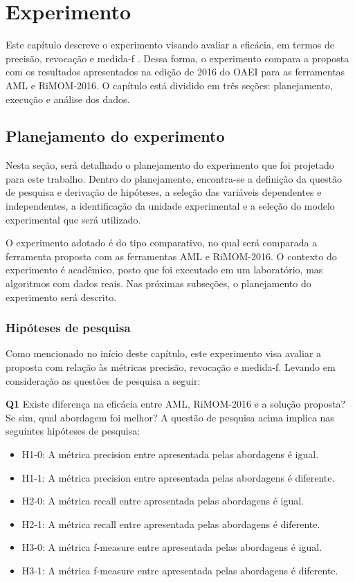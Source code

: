 \chapter{Experimento}
Este capítulo descreve o experimento visando avaliar a eficácia, em termos de precisão, revocação e medida-f \cite{goutte2005probabilistic}. Dessa forma,  o experimento compara a proposta com os resultados apresentados na edição de 2016 do OAEI para as ferramentas AML e RiMOM-2016.
O capítulo está dividido em três seções: planejamento, execução e análise dos dados. 

\section{Planejamento do experimento}

Nesta seção, será detalhado o planejamento do experimento que foi projetado para este trabalho. Dentro do planejamento, encontra-se a definição da questão de pesquisa e derivação de hipóteses, a seleção das variáveis dependentes e independentes, a identificação da unidade experimental e a seleção do modelo experimental que será utilizado.

O experimento adotado é do tipo comparativo, no qual será comparada a ferramenta proposta com as ferramentas AML e RiMOM-2016. O contexto do experimento é acadêmico, posto que foi executado em um laboratório, mas algoritmos com dados reais. Nas próximas subseções, o planejamento do experimento será descrito.

\subsection{Hipóteses de pesquisa}

Como mencionado no início deste capítulo, este experimento visa avaliar a proposta com relação às métricas precisão, revocação e medida-f. Levando em consideração as questões de pesquisa a seguir:

\textbf{Q1} Existe diferença na eficácia entre AML, RiMOM-2016 e a solução proposta? Se sim, qual abordagem foi melhor?
A questão de pesquisa acima implica nas seguintes hipóteses de pesquisa:

\begin{itemize}
\item H1-0: A métrica precision entre apresentada pelas abordagens é igual.
\item H1-1: A métrica precision entre apresentada pelas abordagens é diferente.
\item H2-0: A métrica recall entre apresentada pelas abordagens é igual.
\item H2-1: A métrica recall entre apresentada pelas abordagens é diferente.
\item H3-0: A métrica f-measure entre apresentada pelas abordagens é igual.
\item H3-1: A métrica f-measure entre apresentada pelas abordagens é diferente.
\end{itemize}


